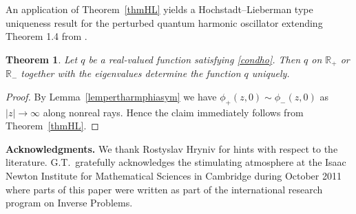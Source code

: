 \documentclass{amsart}
\newtheorem{theorem}{Theorem}[section]
\numberwithin{equation}{section}
\begin{document}
An application of Theorem~\ref{thmHL} yields a Hochstadt--Lieberman type uniqueness result for the perturbed quantum harmonic oscillator extending Theorem 1.4 from \cite{gs2}.

\begin{theorem}
Let $q$ be a real-valued function satisfying \eqref{condho}.
Then $q$ on ${{\mathbb R}}_+$ or ${{\mathbb R}}_-$ together with the eigenvalues determine the function $q$ uniquely.
\end{theorem}

\begin{proof}
 By Lemma~\ref{lempertharmphiasym} we have $\phi_+(z,0)\sim\phi_-(z,0)$ as $|z|\rightarrow\infty$ along nonreal rays.
  Hence the claim immediately follows from Theorem~\ref{thmHL}.
\end{proof}

\bigskip
\noindent
{\bf Acknowledgments.}
We thank Rostyslav Hryniv for hints with respect to the literature.
G.T.\ gratefully acknowledges the stimulating
atmosphere at the Isaac Newton Institute for Mathematical Sciences in Cambridge
during October 2011 where parts of this paper were written as part of  the international
research program on Inverse Problems.
\end{document}
